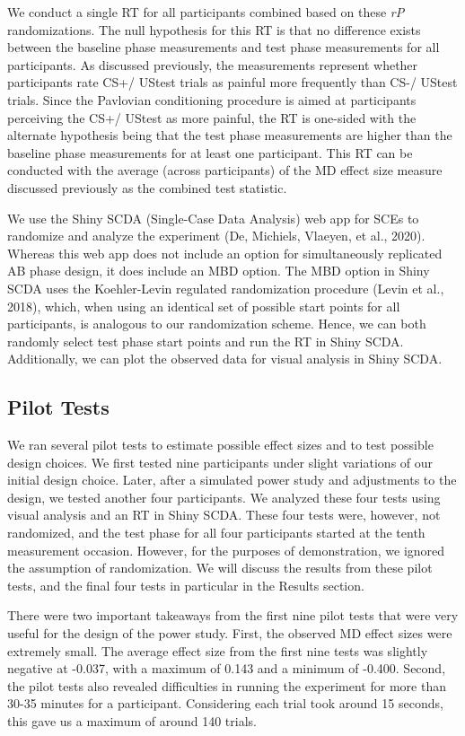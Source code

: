 \documentclass{article}
\begin{document}
We conduct a single RT for all participants combined based on these \emph{r}\emph{P} randomizations. The null hypothesis for this RT is that no difference exists between the baseline phase measurements and test phase measurements for all participants. As discussed previously, the measurements represent whether participants rate CS+/ UStest trials as painful more frequently than CS-/ UStest trials. Since the Pavlovian conditioning procedure is aimed at participants perceiving the CS+/ UStest as more painful, the RT is one-sided with the alternate hypothesis being that the test phase measurements are higher than the baseline phase measurements for at least one participant. This RT can be conducted with the average (across participants) of the MD effect size measure discussed previously as the combined test statistic.

We use the Shiny SCDA (Single-Case Data Analysis) web app for SCEs to randomize and analyze the experiment (De, Michiels, Vlaeyen, et al., 2020). Whereas this web app does not include an option for simultaneously replicated AB phase design, it does include an MBD option. The MBD option in Shiny SCDA uses the Koehler-Levin regulated randomization procedure (Levin et al., 2018), which, when using an identical set of possible start points for all participants, is analogous to our randomization scheme. Hence, we can both randomly select test phase start points and run the RT in Shiny SCDA. Additionally, we can plot the observed data for visual analysis in Shiny SCDA. 

\subsection{Pilot Tests}

We ran several pilot tests to estimate possible effect sizes and to test possible design choices. We first tested nine participants under slight variations of our initial design choice. Later, after a simulated power study and adjustments to the design, we tested another four participants. We analyzed these four tests using visual analysis and an RT in Shiny SCDA. These four tests were, however, not randomized, and the test phase for all four participants started at the tenth measurement occasion. However, for the purposes of demonstration, we ignored the assumption of randomization. We will discuss the results from these pilot tests, and the final four tests in particular in the Results section. 

There were two important takeaways from the first nine pilot tests that were very useful for the design of the power study. First, the observed MD effect sizes were extremely small. The average effect size from the first nine tests was slightly negative at -0.037, with a maximum of 0.143 and a minimum of -0.400. Second, the pilot tests also revealed difficulties in running the experiment for more than 30-35 minutes for a participant. Considering each trial took around 15 seconds, this gave us a maximum of around 140 trials.
\end{document}
